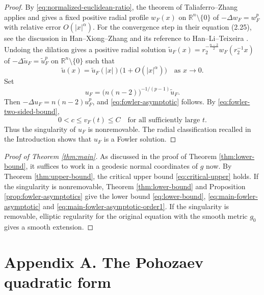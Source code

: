 \documentclass[11pt]{article}
\numberwithin{equation}{section}
\theoremstyle{remark}
\newcommand{\R}{\mathbb R}
\begin{document}
\begin{proof}
By \eqref{eq:normalized-euclidean-ratio}, the theorem of Taliaferro--Zhang
\cite[Theorem  1]{TZ} applies and gives a fixed positive radial profile $w_F(x)$ on \(\R^n\setminus\{0\}\) of \(-\Delta w_F = w_F^p\)
with relative error \(O(|x|^\alpha)\). For the convergence step in
their equation  (2.25), see the discussion in
Han--Xiong--Zhang  \cite[proof of Theorem  1.4]{HanXiongZhang} and its
reference to Han--Li--Teixeira  \cite[Theorem  3]{HanLiTeixeira}.
Undoing the dilation gives a positive radial solution
\(\widetilde u_F(x) = r_2^{-\frac{n-2}{2}}w_F(r_2^{-1}x)\) of
\(
 -\Delta\widetilde u_F=\widetilde u_F^p
\) on \(\R^n\setminus\{0\}\)
such that
\[
 \widetilde u(x)=\widetilde u_F(|x|)
 \bigl(1+O(|x|^\alpha)\bigr)
 \quad\text{as }x\to0.
\]
Set
\[
 u_F=\bigl(n(n-2)\bigr)^{-1/(p-1)}\widetilde u_F.
\]
Then \(-\Delta u_F=n(n-2)u_F^p\), and
\eqref{eq:fowler-asymptotic} follows. By
\eqref{eq:fowler-two-sided-bound},
\[
 0<c\le v_F(t)\le C
 \quad\text{for all sufficiently large }t.
\]
Thus the singularity of \(u_F\) is nonremovable. The radial
classification recalled in the Introduction shows that \(u_F\) is a
Fowler solution.
\end{proof}



\par


\begin{proof}[Proof of Theorem  \ref{thm:main}]
 As discussed in the proof of Theorem  \ref{thm:lower-bound}, it suffices to work in a geodesic normal coordinates of $g$ now. 
By Theorem  \ref{thm:upper-bound}, the critical upper bound \eqref{eq:critical-upper} holds. If the
singularity is nonremovable, Theorem  \ref{thm:lower-bound} and
Proposition  \ref{prop:fowler-asymptotics} give the lower bound \eqref{eq:lower-bound}, 
\eqref{eq:main-fowler-asymptotic} and
\eqref{eq:main-fowler-asymptotic-order1}.
If the singularity is removable, elliptic regularity for the original
equation with the smooth metric \(g_0\) gives a smooth extension.
\end{proof}



\appendix

\label{app:quadratic-estimate}
\section*{Appendix A. The Pohozaev quadratic form}
\end{document}
